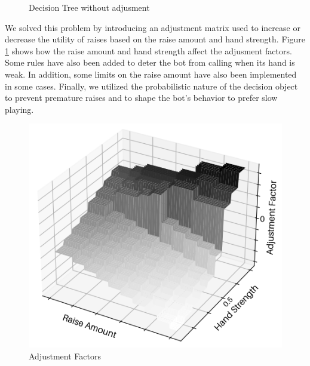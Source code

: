 \begin{figure}[h]
    \centering
    \caption{Decision Tree without adjusment}
\end{figure}

We solved this problem by introducing an adjustment matrix used to increase or decrease the utility of raises based on the raise amount and hand strength. Figure \ref{fig:adfactors} shows how the raise amount and hand strength affect the adjusment factors. Some rules have also been added to deter the bot from calling when its hand is weak. In addition, some limits on the raise amount have also been implemented in some cases. Finally, we utilized the probabilistic nature of the decision object to prevent premature raises and to shape the bot's behavior to prefer slow playing.

\begin{figure}[h] 
    \centering
    \includegraphics[width=\textwidth/2]{graphics/adfactors.png}
    \caption{Adjustment Factors}
    \label{fig:adfactors}
\end{figure}

